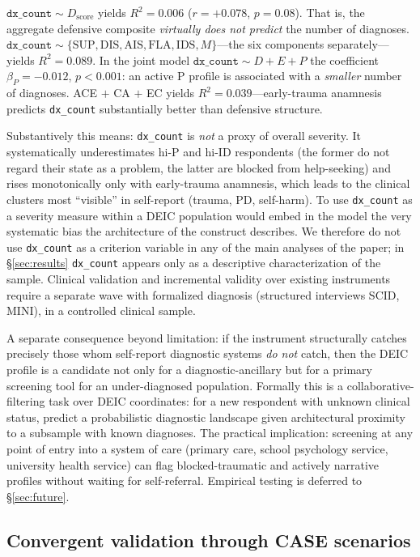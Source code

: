 $\texttt{dx\_count} \sim D_{\mathrm{score}}$ yields $R^2 = 0.006$ ($r = +0.078$, $p = 0.08$). That is, the aggregate defensive composite \emph{virtually does not predict} the number of diagnoses. $\texttt{dx\_count} \sim \{\mathrm{SUP}, \mathrm{DIS}, \mathrm{AIS}, \mathrm{FLA}, \mathrm{IDS}, M\}$---the six components separately---yields $R^2 = 0.089$. In the joint model $\texttt{dx\_count} \sim D + E + P$ the coefficient $\beta_P = -0.012$, $p < 0.001$: an active P profile is associated with a \emph{smaller} number of diagnoses. ACE $+$ CA $+$ EC yields $R^2 = 0.039$---early-trauma anamnesis predicts \texttt{dx\_count} substantially better than defensive structure.

Substantively this means: \texttt{dx\_count} is \emph{not} a proxy of overall severity. It systematically underestimates hi-P and hi-ID respondents (the former do not regard their state as a problem, the latter are blocked from help-seeking) and rises monotonically only with early-trauma anamnesis, which leads to the clinical clusters most ``visible'' in self-report (trauma, PD, self-harm). To use \texttt{dx\_count} as a severity measure within a DEIC population would embed in the model the very systematic bias the architecture of the construct describes. We therefore do not use \texttt{dx\_count} as a criterion variable in any of the main analyses of the paper; in §\ref{sec:results} \texttt{dx\_count} appears only as a descriptive characterization of the sample. Clinical validation and incremental validity over existing instruments require a separate wave with formalized diagnosis (structured interviews SCID, MINI), in a controlled clinical sample.

A separate consequence beyond limitation: if the instrument structurally catches precisely those whom self-report diagnostic systems \emph{do not} catch, then the DEIC profile is a candidate not only for a diagnostic-ancillary but for a primary screening tool for an under-diagnosed population. Formally this is a collaborative-filtering task over DEIC coordinates: for a new respondent with unknown clinical status, predict a probabilistic diagnostic landscape given architectural proximity to a subsample with known diagnoses. The practical implication: screening at any point of entry into a system of care (primary care, school psychology service, university health service) can flag blocked-traumatic and actively narrative profiles without waiting for self-referral. Empirical testing is deferred to §\ref{sec:future}.

\subsection{Convergent validation through CASE scenarios}
\label{subsec:case_convergent}

